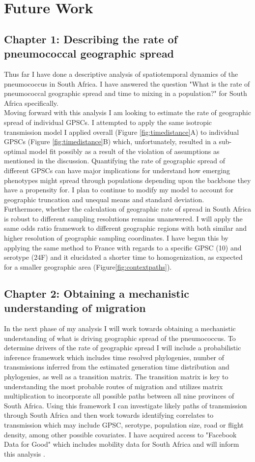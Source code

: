 \documentclass{article}
\begin{document}
\section{Future Work}
\subsection{Chapter 1: Describing the rate of pneumococcal geographic spread}
Thus far I have done a descriptive analysis of spatiotemporal dynamics of the pneumococcus in South Africa. I have answered the question "What is the rate of pneumococcal geographic spread and time to mixing in a population?" for South Africa specifically. \\Moving forward with this analysis I am looking to estimate the rate of geographic spread of individual GPSCs. I attempted to apply the same isotropic transmission model I applied overall (Figure \ref{fig:timedistance}A) to individual GPSCs (Figure \ref{fig:timedistance}B)  which, unfortunately, resulted in a sub-optimal model fit possibly as a result of the violation of assumptions as mentioned in the discussion. Quantifying the rate of geographic spread of different GPSCs can have major implications for understand how emerging phenotypes might spread through populations depending upon the backbone they have a propensity for. I plan to continue to modify my model to account for geographic truncation and unequal means and standard deviation.\\ Furthermore, whether the calculation of geographic rate of spread in South Africa is robust to different sampling resolutions remains unanswered. I will apply the same odds ratio framework to different geographic regions with both similar and higher resolution of geographic sampling coordinates. I have begun this by applying the same method to France with regards to a specific GPSC (10) and serotype (24F) and it elucidated a shorter time to homogenization, as expected for a smaller geographic area (Figure\ref{fig:contextpaths}). 
\subsection{Chapter 2: Obtaining a mechanistic understanding of migration}
In the next phase of my analysis I will work towards obtaining a mechanistic understanding of what is driving geographic spread of the pneumococcus. To determine drivers of the rate of geographic spread I will include a probabilistic inference framework which includes time resolved phylogenies, number of transmissions inferred from the estimated generation time distribution and phylogenies, as well as a transition matrix. The transition matrix is key to understanding the most probable routes of migration and utilizes matrix multiplication to incorporate all possible paths between all nine provinces of South Africa. Using this framework I can investigate likely paths of transmission through South Africa and then work towards identifying correlates to transmission which may include GPSC, serotype, population size, road or flight density, among other possible covariates\cite{saljeReconstructingUnseenTransmission2020a}.  I have acquired access to "Facebook Data for Good" which includes mobility data for South Africa and will inform this analysis \cite{MovementRangeMaps}.
\end{document}
